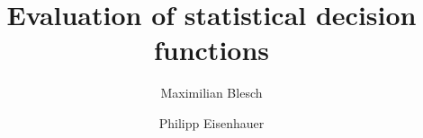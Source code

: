 \title{Evaluation of statistical decision functions}

\author[1]{Maximilian Blesch}
\author[2]{Philipp Eisenhauer}



